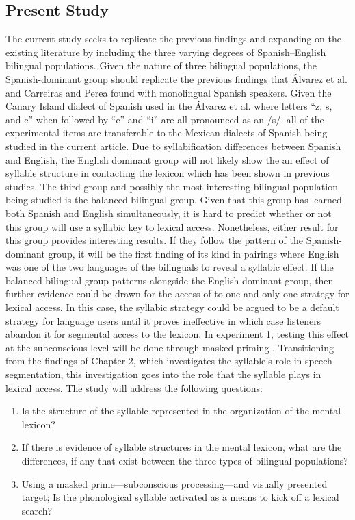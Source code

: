 \subsection{Present Study}
The current study seeks to replicate the previous findings and expanding on the existing literature by including the three varying degrees of Spanish–English bilingual populations. Given the nature of three bilingual populations, the Spanish-dominant group should replicate the previous findings that Álvarez et al. \parencite*{Alvarez2004-nd} and Carreiras and Perea \parencite*{Carreiras2002-mp} found with monolingual Spanish speakers. Given the Canary Island dialect of Spanish used in the Álvarez et al. \parencite*{Alvarez2004-nd} where letters “z, s, and c” when followed by “e” and “i” are all pronounced as an /s/, all of the experimental items are transferable to the Mexican dialects of Spanish being studied in the current article. Due to syllabification differences between Spanish and English, the English dominant group will not likely show the an effect of syllable structure in contacting the lexicon which has been shown in previous studies. The third group and possibly the most interesting bilingual population being studied is the balanced bilingual group. Given that this group has learned both Spanish and English simultaneously, it is hard to predict whether or not this group will use a syllabic key to lexical access. Nonetheless, either result for this group provides interesting results. If they follow the pattern of the Spanish-dominant group, it will be the first finding of its kind in pairings where English was one of the two languages of the bilinguals to reveal a syllabic effect. If the balanced bilingual group patterns alongside the English-dominant group, then further evidence could be drawn for the access of to one and only one strategy for lexical access. In this case, the syllabic strategy could be argued to be a default strategy for language users until it proves ineffective in which case listeners abandon it for segmental access to the lexicon. In experiment 1, testing this effect at the subconscious level will be done through masked priming \citep{Forster1984-sf}. 
Transitioning from the findings of Chapter 2, which investigates the syllable’s role in speech segmentation, this investigation goes into the role that the syllable plays in lexical access. The study will address the following questions:
\begin{enumerate}
\item{Is the structure of the syllable represented in the organization of the mental lexicon?}
\item{If there is evidence of syllable structures in the mental lexicon, what are the differences, if any that exist between the three types of bilingual populations?}
\item{Using a masked prime—subconscious processing—and visually presented target; Is the phonological syllable activated as a means to kick off a lexical search?}
\end{enumerate}

